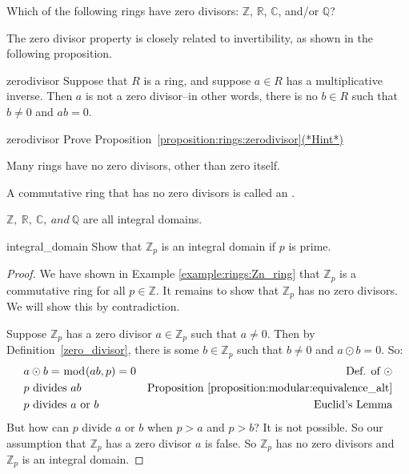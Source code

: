 \begin{exercise}{}
Which of the following rings have zero divisors: $\mathbb{Z}$, $\mathbb{R}$, $\mathbb{C}$, and/or $\mathbb{Q}$?
\end{exercise}

The zero divisor property is closely related to invertibility, as shown in the following proposition.

\begin{prop}{zerodivisor}
Suppose that $R$ is a ring, and suppose $a \in R$ has a multiplicative inverse. Then $a$ is not a zero divisor--in other words, there is no $b \in R$ such that $b\neq 0$ and $a   b = 0$.
\end{prop}

\begin{exercise}{zerodivisor}
Prove Proposition~\ref{proposition:rings:zerodivisor}\hyperref[ringsHints]{(*Hint*)} 
\end{exercise}

Many rings have no zero divisors, other than zero itself.

\begin{defn}\label{int_dom}
A commutative ring that has no zero divisors is called an .
\end{defn}

${\mathbb Z},~{\mathbb R},~{\mathbb C},~and~{\mathbb Q}$ are all integral domains.

\begin{example}{integral_domain}
Show that ${\mathbb Z}_p$ is an integral domain if $p$ is prime.

\begin{proof}
We have shown in Example \ref{example:rings:Zn_ring} that ${\mathbb Z}_p$ is a commutative ring for all $p\in{\mathbb Z}$.  It remains to show that ${\mathbb Z}_p$ has no zero divisors.  We will show this by contradiction.

Suppose ${\mathbb Z}_p$ has a zero divisor $a\in{\mathbb Z}_p$ such that $a\neq 0$.  Then by Definition~\ref{zero_divisor}, there is some $b\in{\mathbb Z}_p$ such that $b\neq 0$ and $a\odot b=0$.  So:
\begin{align*}
&a\odot b=\bmod(ab,p)=0 & \text{Def. of }\odot\\
&p \text{ divides } ab & \text{Proposition }\ref{proposition:modular:equivalence_alt}\\
&p \text{ divides } a \text{ or } b & \text{Euclid's Lemma}\\
\end{align*}
But how can $p$ divide $a$ or $b$ when $p>a$ and $p>b$?  It is not possible.  So our assumption that ${\mathbb Z}_p$ has a zero divisor $a$ is false.  So ${\mathbb Z}_p$ has no zero divisors and ${\mathbb Z}_p$ is an integral domain.
\end{proof}
\end{example}

